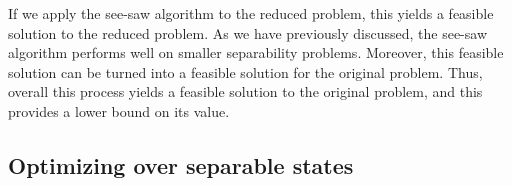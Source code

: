 If we apply the see-saw algorithm to the reduced problem, this yields a feasible solution to the reduced problem. 
As we have previously discussed, the see-saw algorithm performs well on smaller separability problems. 
Moreover, this feasible solution can be turned into a feasible solution for the original problem. 
Thus, overall this process yields a feasible solution to the original problem, and this provides a lower bound on its value. 


\subsection{Optimizing over separable states}\label{ss:ch2_SEP-sep_states}   

